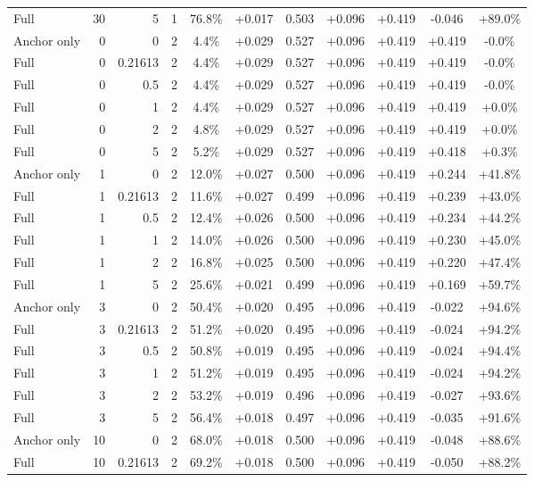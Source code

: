 \begin{table}[htbp]
\begin{tabular}{lrrrccccccc}
Full & 30 & 5 & 1 & 76.8\% & +0.017 & 0.503 & +0.096 & +0.419 & -0.046 & +89.0\% \\
Anchor only & 0 & 0 & 2 & 4.4\% & +0.029 & 0.527 & +0.096 & +0.419 & +0.419 & -0.0\% \\
Full & 0 & 0.21613 & 2 & 4.4\% & +0.029 & 0.527 & +0.096 & +0.419 & +0.419 & -0.0\% \\
Full & 0 & 0.5 & 2 & 4.4\% & +0.029 & 0.527 & +0.096 & +0.419 & +0.419 & -0.0\% \\
Full & 0 & 1 & 2 & 4.4\% & +0.029 & 0.527 & +0.096 & +0.419 & +0.419 & +0.0\% \\
Full & 0 & 2 & 2 & 4.8\% & +0.029 & 0.527 & +0.096 & +0.419 & +0.419 & +0.0\% \\
Full & 0 & 5 & 2 & 5.2\% & +0.029 & 0.527 & +0.096 & +0.419 & +0.418 & +0.3\% \\
Anchor only & 1 & 0 & 2 & 12.0\% & +0.027 & 0.500 & +0.096 & +0.419 & +0.244 & +41.8\% \\
Full & 1 & 0.21613 & 2 & 11.6\% & +0.027 & 0.499 & +0.096 & +0.419 & +0.239 & +43.0\% \\
Full & 1 & 0.5 & 2 & 12.4\% & +0.026 & 0.500 & +0.096 & +0.419 & +0.234 & +44.2\% \\
Full & 1 & 1 & 2 & 14.0\% & +0.026 & 0.500 & +0.096 & +0.419 & +0.230 & +45.0\% \\
Full & 1 & 2 & 2 & 16.8\% & +0.025 & 0.500 & +0.096 & +0.419 & +0.220 & +47.4\% \\
Full & 1 & 5 & 2 & 25.6\% & +0.021 & 0.499 & +0.096 & +0.419 & +0.169 & +59.7\% \\
Anchor only & 3 & 0 & 2 & 50.4\% & +0.020 & 0.495 & +0.096 & +0.419 & -0.022 & +94.6\% \\
Full & 3 & 0.21613 & 2 & 51.2\% & +0.020 & 0.495 & +0.096 & +0.419 & -0.024 & +94.2\% \\
Full & 3 & 0.5 & 2 & 50.8\% & +0.019 & 0.495 & +0.096 & +0.419 & -0.024 & +94.4\% \\
Full & 3 & 1 & 2 & 51.2\% & +0.019 & 0.495 & +0.096 & +0.419 & -0.024 & +94.2\% \\
Full & 3 & 2 & 2 & 53.2\% & +0.019 & 0.496 & +0.096 & +0.419 & -0.027 & +93.6\% \\
Full & 3 & 5 & 2 & 56.4\% & +0.018 & 0.497 & +0.096 & +0.419 & -0.035 & +91.6\% \\
Anchor only & 10 & 0 & 2 & 68.0\% & +0.018 & 0.500 & +0.096 & +0.419 & -0.048 & +88.6\% \\
Full & 10 & 0.21613 & 2 & 69.2\% & +0.018 & 0.500 & +0.096 & +0.419 & -0.050 & +88.2\% \\

\end{tabular}
\end{table}
